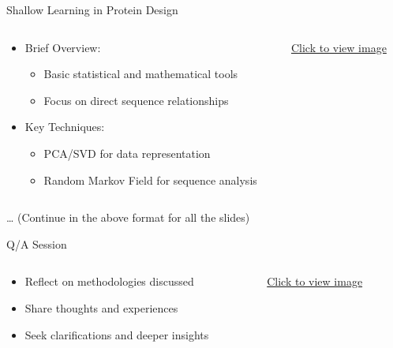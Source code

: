 \documentclass[presentation]{beamer}
\begin{document}
\begin{frame}[label={sec:orgd3f4382}]{Shallow Learning in Protein Design}
\begin{columns}
\begin{column}{0.6\columnwidth}
\begin{itemize}
\item Brief Overview:
\begin{itemize}
\item Basic statistical and mathematical tools
\item Focus on direct sequence relationships
\end{itemize}
\item Key Techniques:
\begin{itemize}
\item PCA/SVD for data representation
\item Random Markov Field for sequence analysis
\end{itemize}
\end{itemize}
\end{column}
\begin{column}{0.4\columnwidth}
\begin{center}
\href{path\_to\_shallow\_learning\_image}{Click to view image}
\end{center}
\end{column}
\end{columns}
\end{frame}

\begin{frame}[label={sec:org9922eca}]{\ldots{}}
(Continue in the above format for all the slides)
\end{frame}

\begin{frame}[label={sec:orgcef5e3f}]{Q/A Session}
\begin{columns}
\begin{column}{0.6\columnwidth}
\begin{itemize}
\item Reflect on methodologies discussed
\item Share thoughts and experiences
\item Seek clarifications and deeper insights
\end{itemize}
\end{column}
\begin{column}{0.4\columnwidth}
\begin{center}
\href{path\_to\_question\_mark\_image}{Click to view image}
\end{center}
\end{column}
\end{columns}
\end{frame}
\end{document}
